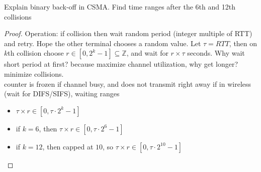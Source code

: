 \documentclass[./answersheet.tex]{subfiles}
\begin{document}
\begin{wts}
    Explain binary back-off in CSMA. Find time ranges after the 6th and 12th collisions
\end{wts}
\begin{proof}
    Operation: if collision then wait random period (integer multiple of RTT) and retry. Hope the other terminal chooses a random value. Let $\tau=RTT$, then on $k$th collision choose $r\in[0,2^{k}-1]\subseteq\mathbb{Z}$, and wait for $r\times\tau$ seconds. Why wait short period at first? because maximize channel utilization, why get longer? minimize collisions.\\

    counter is frozen if channel busy, and does not transmit right away if in wireless (wait for DIFS/SIFS), waiting ranges
    \begin{itemize}[noitemsep]
        \item $\tau\times r\in[0,\tau\cdot 2^{k}-1]$
        \item if $k=6$, then $\tau\times r\in[0,\tau\cdot 2^{6}-1]$
        \item if $k=12$, then capped at $10$, so $\tau\times r\in[0,\tau\cdot 2^{10}-1]$
    \end{itemize}
\end{proof}
\end{document}
